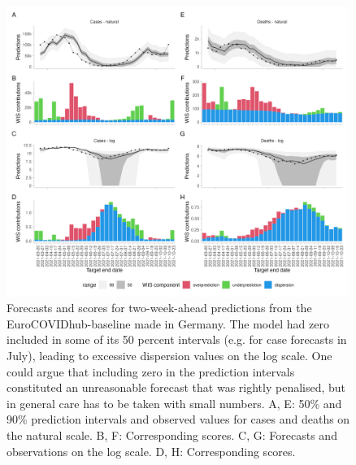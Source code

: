 \documentclass{article}
\begin{document}
\begin{figure}[h!]
    \centering
    \includegraphics[width=0.99\textwidth]{output/figures/HUB-model-comparison-baseline.png}
    \caption{
    Forecasts and scores for two-week-ahead predictions from the EuroCOVIDhub-baseline made in Germany. The model had zero included in some of its 50 percent intervals (e.g. for case forecasts in July), leading to excessive dispersion values on the log scale. One could argue that including zero in the prediction intervals constituted an unreasonable forecast that was rightly penalised, but in general care has to be taken with small numbers. A, E: 50\% and 90\% prediction intervals and observed values for cases and deaths on the natural scale. B, F: Corresponding scores. C, G: Forecasts and observations on the log scale. D, H: Corresponding scores. 
    }
    \label{fig:HUB-model-comparison-baseline}
\end{figure}
\end{document}

